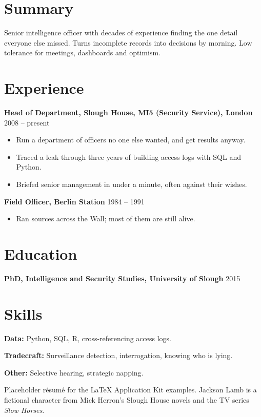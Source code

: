 \documentclass[11pt]{article}
\newcommand{\entry}[2]{\textbf{#1} \hfill {\color{color3}#2}\par}
\begin{document}
\makeletterhead
{}

\section{Summary}
Senior intelligence officer with decades of experience finding the one detail everyone else missed. Turns incomplete records into decisions by morning. Low tolerance for meetings, dashboards and optimism.

\section{Experience}
\entry{Head of Department, Slough House, MI5 (Security Service), London}{2008 -- present}
\begin{itemize}
  \item Run a department of officers no one else wanted, and get results anyway.
  \item Traced a leak through three years of building access logs with SQL and Python.
  \item Briefed senior management in under a minute, often against their wishes.
\end{itemize}
\entry{Field Officer, Berlin Station}{1984 -- 1991}
\begin{itemize}
  \item Ran sources across the Wall; most of them are still alive.
\end{itemize}

\section{Education}
\entry{PhD, Intelligence and Security Studies, University of Slough}{2015}

\section{Skills}
\textbf{Data:} Python, SQL, R, cross-referencing access logs.\par
\textbf{Tradecraft:} Surveillance detection, interrogation, knowing who is lying.\par
\textbf{Other:} Selective hearing, strategic napping.

\vfill
\begin{center}\small\color{color3}Placeholder r\'esum\'e for the LaTeX Application Kit examples. Jackson Lamb is a fictional character from Mick Herron's Slough House novels and the TV series \textit{Slow Horses}.\end{center}
\end{document}
